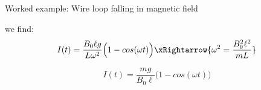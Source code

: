 {\begin{frame}{Worked example: Wire loop falling in magnetic field}
  \vspace{0.2cm}

  we find:
  \begin{equation*}
     I(t) =
        \frac{B_0 \ell g}{L \omega^2}
        \Big( 1 - cos(\omega t) \Big)
        \xRightarrow{\omega^2 = \frac{B_0^2 \ell^2}{mL}}
  \end{equation*}


  \begin{equation*}
     I(t) =
        \frac{mg}{B_0 \ell}
        \Big( 1 - cos(\omega t) \Big)
  \end{equation*}

\end{frame}

} %


%
%

